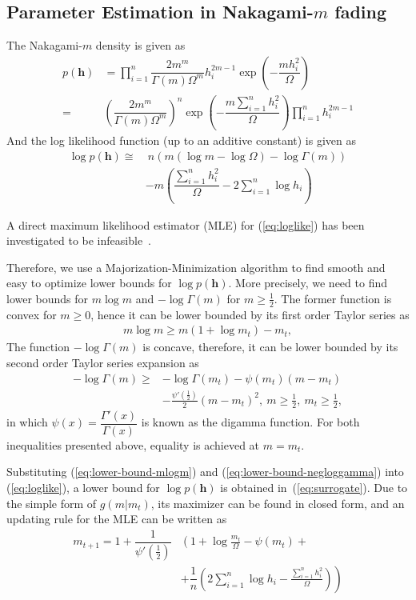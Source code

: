 \documentclass[conference, 10pt]{IEEEtran}
\begin{document}
\subsection{Parameter Estimation in Nakagami-$m$ fading}
The Nakagami-$m$ density is given as
\begin{align}
    p(\bm{h})& = \prod_{i=1}^{n}\dfrac{2m^m}{\Gamma(m)\Omega^{m}}h_i^{2m - 1}
              \exp\left(-\dfrac{mh_i^2}{\Omega}\right) \nonumber \\
          = & \left(\dfrac{2m^m}{\Gamma(m)\Omega^{m}}\right)^{n}
          \exp\left(-\dfrac{m\sum_{i=1}^{n}h_i^2}{\Omega}\right) \prod_{i=1}^{n}h_i^{2m - 1}
\end{align}
And the log likelihood function (up to an additive constant) is given as
\begin{align}
\log p(\bm{h}) \cong &~n\left(m\left(\log m - \log\Omega\right) - \log\Gamma(m)\right)\nonumber
    \\ & -m\left(\dfrac{\sum_{i=1}^{n}h_i^2}{\Omega} - 2\sum_{i=1}^{n}\log h_i\right)
    \label{eq:loglike}
\end{align}

A direct maximum likelihood estimator (MLE) for (\ref{eq:loglike}) has been
investigated to be infeasible~\cite{cheng2001}.

Therefore, we use a Majorization-Minimization algorithm to find smooth
and easy to optimize lower bounds for $\log p(\bm{h})$. More precisely,
we need to find lower bounds for $m\log m$ and $-\log \Gamma(m)$ for $m \geq \frac{1}{2}$.
The former function is convex for $m \geq 0$, hence it can be lower bounded
by its first order Taylor series as
\begin{align}
    m \log m \geq m(1 + \log m_t) - m_t,
    \label{eq:lower-bound-mlogm}
\end{align}
The function $-\log \Gamma(m)$ is concave, therefore, it can be lower bounded
by its second order Taylor series expansion as
\begin{align}
    -\log \Gamma(m) \geq& - \log \Gamma(m_t) - \psi(m_t) (m - m_t)\nonumber\\
                        & - \frac{\psi'\left(\frac{1}{2}\right)}{2}(m - m_t) ^ 2,
                        ~m \geq \frac{1}{2},~m_t \geq \frac{1}{2},
    \label{eq:lower-bound-negloggamma}
\end{align}
in which $\psi(x) = \dfrac{\Gamma'(x)}{\Gamma(x)}$ is known as the digamma function.
For both inequalities presented above, equality is achieved at $m = m_t$.

Substituting (\ref{eq:lower-bound-mlogm}) and (\ref{eq:lower-bound-negloggamma}) into
(\ref{eq:loglike}), a lower bound for $\log p(\bm{h})$ is obtained in~(\ref{eq:surrogate}).
Due to the simple form of $g(m | m_t)$, its maximizer can be found in closed form, and
an updating rule for the MLE can be written as
\begin{align}
    m_{t+1} = 1 + \dfrac{1}{\psi'(\frac{1}{2})}&\left(1 + \log \frac{m_t}{\Omega} - \psi(m_t)
    + \right.\nonumber\\
    &+ \left.\dfrac{1}{n} \left(2\sum_{i=1}^{n}\log h_i - \frac{\sum_{i=1}^{n}h_i^2}{\Omega}\right)\right)
\end{align}
\end{document}
